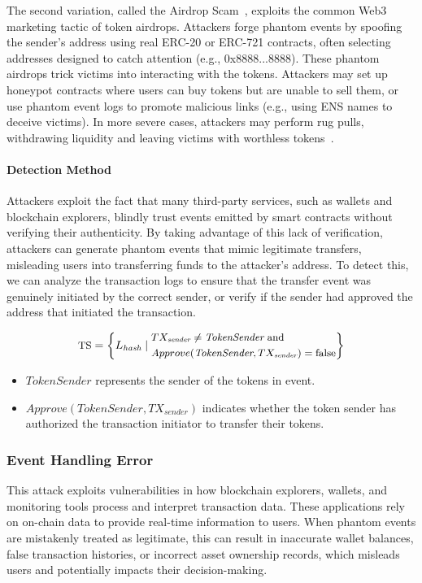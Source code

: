 The second variation, called the Airdrop Scam~\cite{spoof}, exploits the common Web3 marketing tactic of token airdrops. Attackers forge phantom events by spoofing the sender’s address using real ERC-20 or ERC-721 contracts, often selecting addresses designed to catch attention (e.g., 0x8888...8888). These phantom airdrops trick victims into interacting with the tokens. Attackers may set up honeypot contracts where users can buy tokens but are unable to sell them, or use phantom event logs to promote malicious links (e.g., using ENS names to deceive victims). In more severe cases, attackers may perform rug pulls, withdrawing liquidity and leaving victims with worthless tokens~\cite{rugpull}.


\paragraph{Detection Method}
Attackers exploit the fact that many third-party services, such as wallets and blockchain explorers, blindly trust events emitted by smart contracts without verifying their authenticity. By taking advantage of this lack of verification, attackers can generate phantom events that mimic legitimate transfers, misleading users into transferring funds to the attacker's address. To detect this, we can analyze the transaction logs to ensure that the transfer event was genuinely initiated by the correct sender, or verify if the sender had approved the address that initiated the transaction.


\begin{equation}
\small
\text{TS} = \left\{
L_{\textit{hash}} \mid
\begin{aligned}
  & TX_{\textit{sender}} \neq \textit{TokenSender} \text{ and } \\
  & Approve(\textit{TokenSender}, TX_{\textit{sender}}) = \text{false}
\end{aligned}
\right\}
\end{equation}


\begin{itemize}
    \item \( \textit{TokenSender} \) represents the sender of the tokens in event.
    \item \( Approve(\textit{TokenSender}, TX_{\textit{sender}}) \) indicates whether the token sender has authorized the transaction initiator to transfer their tokens.
\end{itemize}

\subsubsection{Event Handling Error}\label{vec:attack5}
This attack exploits vulnerabilities in how blockchain explorers, wallets, and monitoring tools process and interpret transaction data. These applications rely on on-chain data to provide real-time information to users. When phantom events are mistakenly treated as legitimate, this can result in inaccurate wallet balances, false transaction histories, or incorrect asset ownership records, which misleads users and potentially impacts their decision-making.

